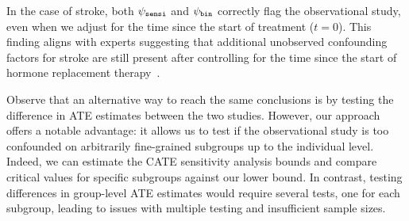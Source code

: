 In the case of stroke, both $\psi_{\texttt{sensi}}$ and $\psi_{\texttt{bin}}$ correctly flag the observational study, even when we adjust for the time since the start of treatment ($t=0$). This finding aligns with experts suggesting that additional unobserved confounding factors for stroke are still present after controlling for the time since the start of hormone replacement therapy~\citep{prentice2005combined}.

Observe that an alternative way to reach the same conclusions is by testing the difference in ATE estimates between the two studies. However, our approach offers a notable advantage: it allows us to test if the observational study is too confounded on arbitrarily fine-grained subgroups up to the individual level. Indeed, we can estimate the CATE sensitivity analysis bounds and compare critical values for specific subgroups against our lower bound. In contrast, testing differences in group-level ATE estimates would require several tests, one for each subgroup, leading to issues with multiple testing and insufficient sample sizes.






